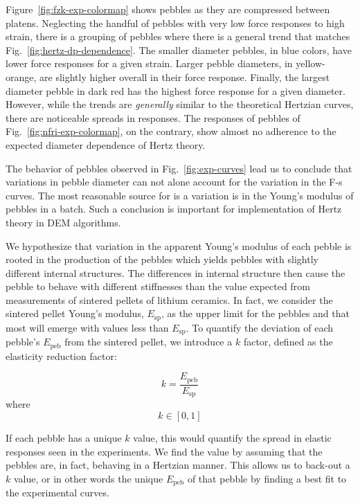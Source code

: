 Figure~\ref{fig:fzk-exp-colormap} shows \lis pebbles as they are compressed between platens. Neglecting the handful of pebbles with very low force responses to high strain, there is a grouping of pebbles where there is a general trend that matches Fig.~\ref{fig:hertz-dp-dependence}. The smaller diameter pebbles, in blue colors, have lower force responses for a given strain. Larger pebble diameters, in yellow-orange, are slightly higher overall in their force response. Finally, the largest diameter pebble in dark red has the highest force response for a given diameter. However, while the trends are \textit{generally} similar to the theoretical Hertzian curves, there are noticeable spreads in responses. The responses of \lit pebbles of Fig.~\ref{fig:nfri-exp-colormap}, on the contrary, show almost no adherence to the expected diameter dependence of Hertz theory. 

The behavior of pebbles observed in Fig.~\ref{fig:exp-curves} lead us to conclude that variations in pebble diameter can not alone account for the variation in the F-s curves. The most reasonable source for is a variation is in the Young's modulus of pebbles in a batch. Such a conclusion is important for implementation of Hertz theory in DEM algorithms.

We hypothesize that variation in the apparent Young's modulus of each pebble is rooted in the production of the pebbles which yields pebbles with slightly different internal structures. The differences in internal structure then cause the pebble to behave with different stiffnesses than the value expected from measurements of sintered pellets of lithium ceramics. In fact, we consider the sintered pellet Young's modulus, $E_\text{sp}$, as the upper limit for the pebbles and that most will emerge with values less than $E_\text{sp}$. To quantify the deviation of each pebble's $E_\text{peb}$ from the sintered pellet, we introduce a $k$ factor, defined as the elasticity reduction factor:

\begin{equation}
k = \frac{E_\text{peb}}{E_\text{sp}}
\end{equation}
where
\[
k \in [0,1]
\]

If each pebble has a unique $k$ value, this would quantify the spread in elastic responses seen in the experiments. We find the value by assuming that the pebbles are, in fact, behaving in a Hertzian manner. This allows us to back-out a $k$ value, or in other words the unique $E_\text{peb}$ of that pebble by finding a best fit to the experimental curves. 

